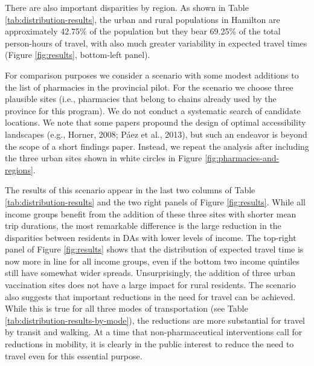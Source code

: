 \documentclass[]{elsarticle} %
\begin{document}
There are also important disparities by region. As shown in Table
\ref{tab:distribution-results}, the urban and rural populations in
Hamilton are approximately 42.75\% of the population but they bear
69.25\% of the total person-hours of travel, with also much greater
variability in expected travel times (Figure \ref{fig:results},
bottom-left panel).

For comparison purposes we consider a scenario with some modest
additions to the list of pharmacies in the provincial pilot. For the
scenario we choose three plausible sites (i.e., pharmacies that belong
to chains already used by the province for this program). We do not
conduct a systematic search of candidate locations. We note that some
papers propound the design of optimal accessibility landscapes (e.g.,
Horner, 2008; Páez et al., 2013), but such an endeavor is beyond the
scope of a short findings paper. Instead, we repeat the analysis after
including the three urban sites shown in white circles in Figure
\ref{fig:pharmacies-and-regions}.

The results of this scenario appear in the last two columns of Table
\ref{tab:distribution-results} and the two right panels of Figure
\ref{fig:results}. While all income groups benefit from the addition of
these three sites with shorter mean trip durations, the most remarkable
difference is the large reduction in the disparities between residents
in DAs with lower levels of income. The top-right panel of Figure
\ref{fig:results} shows that the distribution of expected travel time is
now more in line for all income groups, even if the bottom two income
quintiles still have somewhat wider spreads. Unsurprisingly, the
addition of three urban vaccination sites does not have a large impact
for rural residents. The scenario also suggests that important
reductions in the need for travel can be achieved. While this is true
for all three modes of transportation (see Table
\ref{tab:distribution-results-by-mode}), the reductions are more
substantial for travel by transit and walking. At a time that
non-pharmaceutical interventions call for reductions in mobility, it is
clearly in the public interest to reduce the need to travel even for
this essential purpose.
\end{document}
